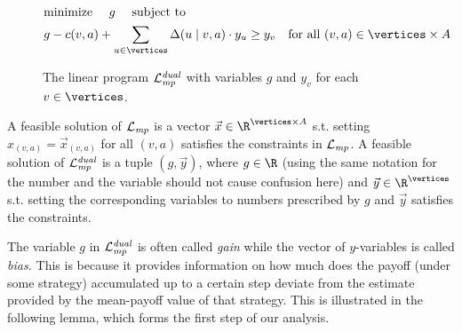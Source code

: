 \begin{figure}[h]
	\begin{alignat}{2}
	&\text{{minimize} }\quad g \quad \textrm{ 
		subject to }\nonumber \\
	&g -\colouring(v,a) + \sum_{u\in\vertices}\probTranFunc(u\mid v,a)\cdot y_u \geq y_v 
	\quad\text{for all $(v,a)\in \vertices\times \actions$}
	\end{alignat}
	\caption{The linear program $\mathcal{L}_{\mathit{mp}}^{\mathit{dual}}$ with variables $g$ and $y_v$ for each  $v\in \vertices$.}
	\label{5-fig:mp-dual}
\end{figure}

\begin{remark}[Nomenclature]
A feasible solution of $ \mathcal{L}_{\mathit{mp}} $ is a vector $\vec{x} \in \R^{\vertices\times \actions} $ s.t. setting $ x_{(v,a)}=\vec{x}_{(v,a)} $ for all $ (v,a) $ satisfies the constraints in $ \mathcal{L}_{\mathit{mp}} $. A feasible solution of $ \mathcal{L}_{\mathit{mp}}^{\mathit{dual}}  $ is a tuple $ (g,\vec{y}) $, where $ g\in\R $ (using the same notation for the number and the variable should not cause  confusion here) and $ \vec{y}\in \R^{\vertices}$ s.t. setting the corresponding variables to numbers prescribed by $ g $ and $ \vec{y} $ satisfies the constraints.
\end{remark}

The variable $g$ in $\mathcal{L}_{\mathit{mp}}^{\mathit{dual}}$ is often called \emph{gain} while the vector of $y$-variables is called \emph{bias.} This is because it provides information on how much does the payoff (under some strategy) accumulated up to a certain step deviate from the estimate provided by the mean-payoff value of that strategy. This is illustrated in the following lemma, which forms the first step of our analysis. 

